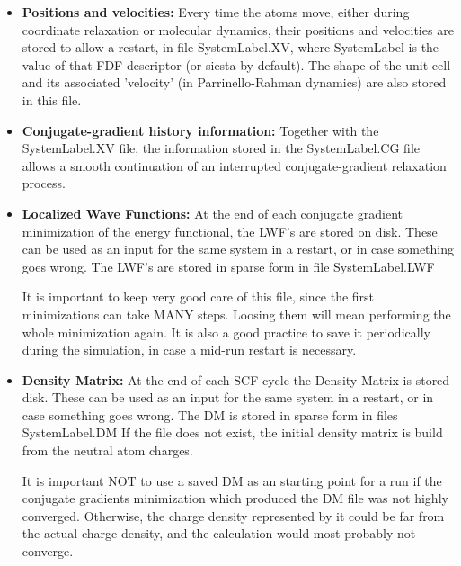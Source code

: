 \begin{itemize}
\item {\bf Positions and velocities:}
Every time the atoms move, either during coordinate relaxation or
molecular dynamics, their positions and velocities are stored
to allow a restart, in file SystemLabel.XV, where SystemLabel
is the value of that FDF descriptor (or siesta by default).
The shape of the
unit cell and its associated 'velocity' (in Parrinello-Rahman
dynamics) are also stored in this file.

\item {\bf Conjugate-gradient history information:}
Together with the SystemLabel.XV file, the information
stored in the SystemLabel.CG file allows a smooth
continuation of an interrupted conjugate-gradient relaxation
process.

\item {\bf Localized Wave Functions:} 
At the end of each conjugate gradient
minimization of the energy functional, the LWF's are
stored on disk. These can be used as an input for
the same system in a restart, or in case something goes
wrong.  The LWF's are stored in sparse form in
file SystemLabel.LWF

It is important to keep very good care of this file,
since the first minimizations can take MANY
steps. Loosing them will mean performing the 
whole minimization again. It is also a good practice 
to save it periodically during the
simulation, in case a mid-run restart is necessary.

\item {\bf Density Matrix:} At the end of each SCF cycle
the Density Matrix is stored
disk. These can be used as an input for
the same system in a restart, or in case something goes
wrong.  The DM is stored in sparse form in files
SystemLabel.DM
If the file does not exist, the initial density
matrix is build from the neutral atom charges.

It is important NOT to use a saved DM as an starting
point for a run if the conjugate gradients minimization
which produced the DM file was not highly converged.
Otherwise, the charge density represented by it
could be far from the actual charge density, and
the calculation would most probably not converge.
\end{itemize}


%
%
%
%


